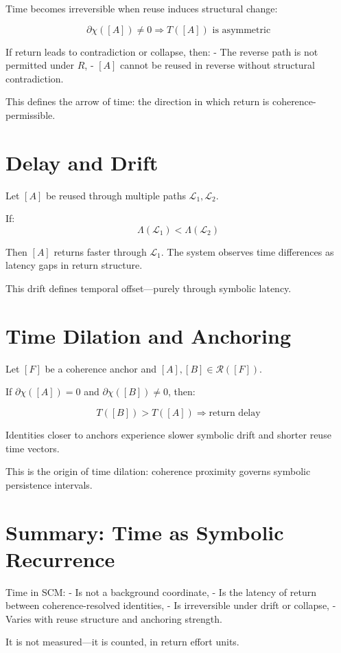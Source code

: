 Time becomes irreversible when reuse induces structural change:

\[
\partial\chi([A]) \ne 0 \Rightarrow T([A]) \text{ is asymmetric}
\]

If return leads to contradiction or collapse, then:
- The reverse path is not permitted under $R$,
- $[A]$ cannot be reused in reverse without structural contradiction.

This defines the arrow of time: the direction in which return is coherence-permissible.

\section{Delay and Drift} \label{sec:delay-and-drift}

Let $[A]$ be reused through multiple paths $\mathcal{L}_1, \mathcal{L}_2$.

If:
\[
\Lambda(\mathcal{L}_1) < \Lambda(\mathcal{L}_2)
\]

Then $[A]$ returns faster through $\mathcal{L}_1$. The system observes time differences as latency gaps in return structure.

This drift defines temporal offset—purely through symbolic latency.

\section{Time Dilation and Anchoring} \label{sec:time-dilation}

Let $[F]$ be a coherence anchor and $[A], [B] \in \mathcal{R}([F])$.

If $\partial\chi([A]) = 0$ and $\partial\chi([B]) \ne 0$, then:

\[
T([B]) > T([A]) \Rightarrow \text{return delay}
\]

Identities closer to anchors experience slower symbolic drift and shorter reuse time vectors.

This is the origin of time dilation: coherence proximity governs symbolic persistence intervals.

\section{Summary: Time as Symbolic Recurrence} \label{sec:time-summary}

Time in SCM:
- Is not a background coordinate,
- Is the latency of return between coherence-resolved identities,
- Is irreversible under drift or collapse,
- Varies with reuse structure and anchoring strength.

It is not measured—it is counted, in return effort units.

